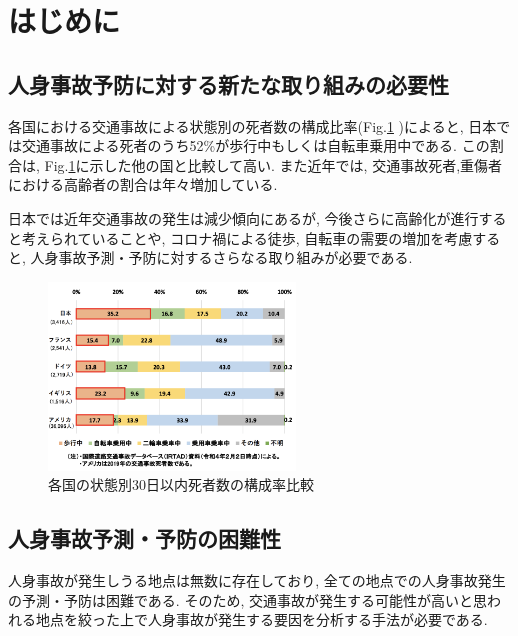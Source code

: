 \documentclass[a4j,8.5pt, twocolumn,fleqn]{jbook}
\begin{document}
\Atitle
\small
\vspace*{-2mm}


\section{はじめに}
\subsection{人身事故予防に対する新たな取り組みの必要性}
各国における交通事故による状態別の死者数の構成比率(Fig.\ref{国別状態別30日以内死者数の構成率比較}
)によると, 日本では交通事故による死者のうち52\%が歩行中もしくは自転車乗用中である. 
この割合は, Fig.\ref{国別状態別30日以内死者数の構成率比較}に示した他の国と比較して高い. 
また近年では, 交通事故死者,重傷者における高齢者の割合は年々増加している\cite{令和3年における交通事故の発生状況等について}. 

日本では近年交通事故の発生は減少傾向にあるが, 今後さらに高齢化が進行すると考えられていることや, コロナ禍による徒歩, 自転車の需要の増加\cite{自転車を巡る現状等}を考慮すると, 人身事故予測・予防に対するさらなる取り組みが必要である. 

\begin{figure}[htb]
    \centering
    \includegraphics[height=50mm]{images/shibou_status.png}
    \vspace{-4mm}
    \caption{各国の状態別30日以内死者数の構成率比較\cite{令和3年における交通事故の発生状況等について}}
    \label{国別状態別30日以内死者数の構成率比較}
\end{figure}

\subsection{人身事故予測・予防の困難性}
人身事故が発生しうる地点は無数に存在しており, 全ての地点での人身事故発生の予測・予防は困難である. 
そのため, 交通事故が発生する可能性が高いと思われる地点を絞った上で人身事故が発生する要因を分析する手法が必要である. 
\end{document}
